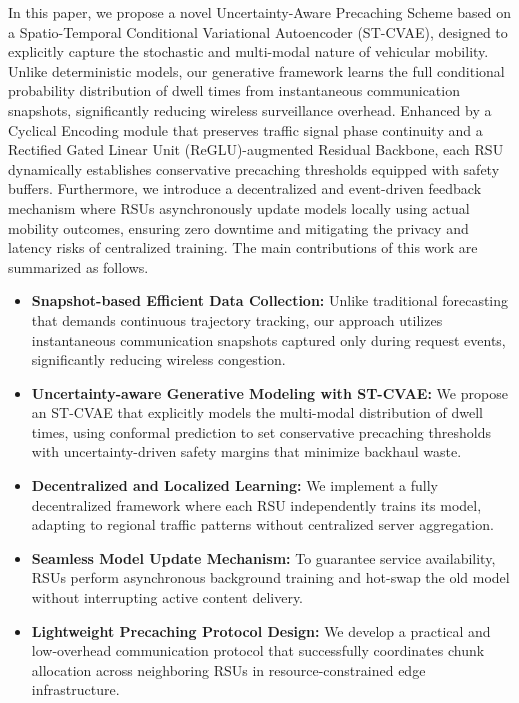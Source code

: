 \documentclass[journal]{IEEEtran}
\begin{document}
\IEEEpubidadjcol
In this paper, we propose a novel Uncertainty-Aware Precaching Scheme based on a Spatio-Temporal Conditional Variational Autoencoder (ST-CVAE), designed to explicitly capture the stochastic and multi-modal nature of vehicular mobility. 
Unlike deterministic models, our generative framework learns the full conditional probability distribution of dwell times from instantaneous communication snapshots, significantly reducing wireless surveillance overhead. 
Enhanced by a Cyclical Encoding module that preserves traffic signal phase continuity and a Rectified Gated Linear Unit (ReGLU)-augmented Residual Backbone, each RSU dynamically establishes conservative precaching thresholds equipped with safety buffers. 
Furthermore, we introduce a decentralized and event-driven feedback mechanism where RSUs asynchronously update models locally using actual mobility outcomes, ensuring zero downtime and mitigating the privacy and latency risks of centralized training.
The main contributions of this work are summarized as follows.
\begin{itemize}
    \item \textbf{Snapshot-based Efficient Data Collection:} Unlike traditional forecasting that demands continuous trajectory tracking, our approach utilizes instantaneous communication snapshots captured only during request events, significantly reducing wireless congestion.
    \item \textbf{Uncertainty-aware Generative Modeling with ST-CVAE:} We propose an ST-CVAE that explicitly models the multi-modal distribution of dwell times, using conformal prediction to set conservative precaching thresholds with uncertainty-driven safety margins that minimize backhaul waste.
    \item \textbf{Decentralized and Localized Learning:} We implement a fully decentralized framework where each RSU independently trains its model, adapting to regional traffic patterns without centralized server aggregation.
    \item \textbf{Seamless Model Update Mechanism:} To guarantee service availability, RSUs perform asynchronous background training and hot-swap the old model without interrupting active content delivery.
    \item \textbf{Lightweight Precaching Protocol Design:} We develop a practical and low-overhead communication protocol that successfully coordinates chunk allocation across neighboring RSUs in resource-constrained edge infrastructure.
\end{itemize}
\end{document}
